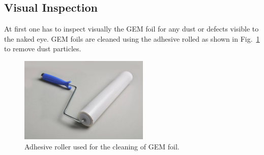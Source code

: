 \subsection{Visual Inspection} %
\label{sub:visual_inspection}
At first one has to inspect visually the GEM foil for any dust or defects visible to the naked eye.
GEM foils are cleaned using the adhesive rolled as shown in Fig.~\ref{fig:adhesive_roller} to remove dust particles.
\begin{figure}[htbp]
    \centering
    \includegraphics[width=0.55\textwidth]{figures/GEM/Adhesive_roller.jpg}
    \caption{Adhesive roller used for the cleaning of GEM foil.}
    \label{fig:adhesive_roller}
\end{figure}

